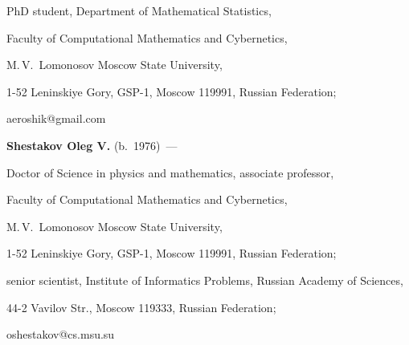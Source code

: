 PhD student, Department of Mathematical Statistics,


Faculty of Computational Mathematics and Cybernetics,


M.\,V.~Lomonosov Moscow State University,


1-52  Leninskiye Gory, GSP-1, Moscow 119991, Russian Federation;


aeroshik@gmail.com





\vspace*{3pt}





\noindent


\textbf{Shestakov Oleg V.} (b.\ 1976)~---


Doctor of Science in physics and mathematics, associate professor,




Faculty of Computational Mathematics and Cybernetics,


M.\,V.~Lomonosov Moscow State University,


1-52  Leninskiye Gory, GSP-1, Moscow 119991, Russian Federation;


senior scientist, Institute of Informatics Problems, Russian Academy of Sciences,


44-2 Vavilov Str., Moscow 119333, Russian Federation;


oshestakov@cs.msu.su





\label{end\stat}





\renewcommand{\bibname}{\protect\rm Литература}
